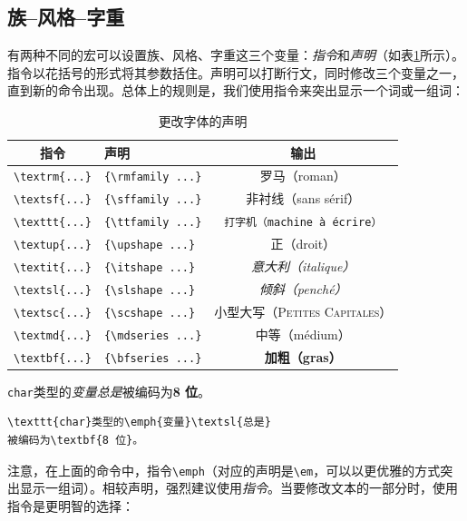 \subsection{族--风格--字重}

有两种不同的宏可以设置族、风格、字重这三个变量：\emph{指令}和\emph{声明}（如表\ref{tab:2.1}所示）。指令以花括号的形式将其参数括住。声明可以打断行文，同时修改三个变量之一，直到新的命令出现。总体上的规则是，我们使用指令来突出显示一个词或一组词：

\begin{table}
    \centering
    \begin{tabular}{|c|l|c|}
\hline
指令 & 声明 & 输出\\
\hline
\verb+\textrm{...}+ & \verb+{\rmfamily ...}+ & 罗马（roman） \\
\verb+\textsf{...}+ & \verb+{\sffamily ...}+ & \textsf{非衬线（sans sérif）} \\
\verb+\texttt{...}+ & \verb+{\ttfamily ...}+ & \texttt{打字机（machine à écrire）} \\
\hline
\verb+\textup{...}+ & \verb+{\upshape ...}+ & 正（droit） \\
\verb+\textit{...}+ & \verb+{\itshape ...}+ & \textit{意大利（italique）} \\
\verb+\textsl{...}+ & \verb+{\slshape ...}+ & \textsl{倾斜（penché）} \\
\verb+\textsc{...}+ & \verb+{\scshape ...}+ & 小型大写（\textsc{Petites Capitales}） \\
\hline
\verb+\textmd{...}+ & \verb+{\mdseries ...}+ & 中等（médium） \\
\verb+\textbf{...}+ & \verb+{\bfseries ...}+ & \textbf{加粗（gras）} \\
\hline
    \end{tabular}
    \caption{更改字体的声明}
    \label{tab:2.1}
\end{table}

\begin{codelist}[2.1]{
    \texttt{char}类型的\emph{变量}\textsl{总是}被编码为\textbf{8 位}。
}
\begin{verbatim}
\texttt{char}类型的\emph{变量}\textsl{总是}
被编码为\textbf{8 位}。\end{verbatim}
\end{codelist}

注意，在上面的命令中，指令\verb|\emph|（对应的声明是\verb|\em|，可以以更优雅的方式突出显示一组词）。相较声明，强烈建议使用\emph{指令}。当要修改文本的一部分时，使用指令是更明智的选择：


